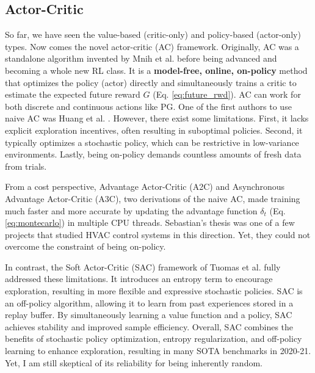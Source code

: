 \documentclass[../main.tex]{subfiles}
\begin{document}
\subsection{Actor-Critic} \label{sec:actor_critic}
So far, we have seen the value-based (critic-only) and policy-based (actor-only) types. Now comes the novel actor-critic (AC) framework. Originally, AC was a standalone algorithm invented by Mnih et al. \cite{mnih2016asynchronous} before being advanced and becoming a whole new RL class. It is a \textbf{model-free, online, on-policy} method that optimizes the policy (actor) directly and simultaneously trains a critic to estimate the expected future reward $G$ (Eq. \ref{eq:future_rwd}). AC can work for both discrete and continuous actions like PG. One of the first authors to use naive AC was Huang et al. \cite{huang2020hvac}. However, there exist some limitations. First, it lacks explicit exploration incentives, often resulting in suboptimal policies. Second, it typically optimizes a stochastic policy, which can be restrictive in low-variance environments. Lastly, being on-policy demands countless amounts of fresh data from trials.

From a cost perspective, Advantage Actor-Critic (A2C) and Asynchronous Advantage Actor-Critic (A3C), two derivations of the naive AC, made training much faster and more accurate by updating the advantage function $\delta_t$ (Eq. \ref{eq:montecarlo}) in multiple CPU threads. Sebastian's thesis \cite{seb23} was one of a few projects that studied HVAC control systems in this direction. Yet, they could not overcome the constraint of being on-policy.

In contrast, the Soft Actor-Critic (SAC) framework of Tuomas et al. \cite{haarnoja2019soft} fully addressed these limitations. It introduces an entropy term to encourage exploration, resulting in more flexible and expressive stochastic policies. SAC is an off-policy algorithm, allowing it to learn from past experiences stored in a replay buffer. By simultaneously learning a value function and a policy, SAC achieves stability and improved sample efficiency. Overall, SAC combines the benefits of stochastic policy optimization, entropy regularization, and off-policy learning to enhance exploration, resulting in many SOTA benchmarks \cite{en14040997, manjavacas2024experimental} in 2020-21. Yet, I am still skeptical of its reliability for being inherently random.
\end{document}
